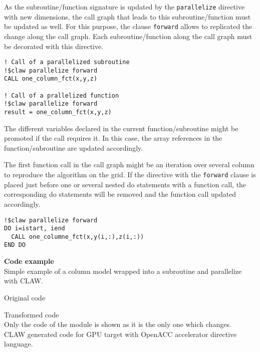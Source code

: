 As the subroutine/function signature is updated by the \lstinline!parallelize! 
directive with new dimensions, the call graph that leads to this 
subroutine/function must be updated as well. For this purpose, the clause 
\lstinline!forward! allows to replicated the change along the call graph. 
Each subroutine/function along the call graph must be decorated with this
directive.

\begin{lstlisting}
! Call of a parallelized subroutine
!$claw parallelize forward
CALL one_column_fct(x,y,z)

! Call of a prallelized function
!$claw parallelize forward
result = one_column_fct(x,y,z)
\end{lstlisting}

The different variables declared in the current function/subroutine might be
promoted if the call requires it. In this case, the array references in 
the function/subroutine are updated accordingly.

The first function call in the call graph might be an iteration over several
column to reproduce the algorithm on the grid. If the directive with the 
\lstinline!forward! clause is placed just before one or several nested do
statements with a function call, the corresponding do statements will be 
removed and the function call updated accordingly. 

\begin{lstlisting}
!$claw parallelize forward
DO i=istart, iend
  CALL one_columne_fct(x,y(i,:),z(i,:))
END DO
\end{lstlisting}






\textbf{Code example}\\
\label{parallelize1}
Simple example of a column model wrapped into a subroutine and parallelize with
CLAW.

Original code



Transformed code\\
Only the code of the module is shown as it is the only one which changes.\\

CLAW generated code for GPU target with OpenACC accelerator directive language.


